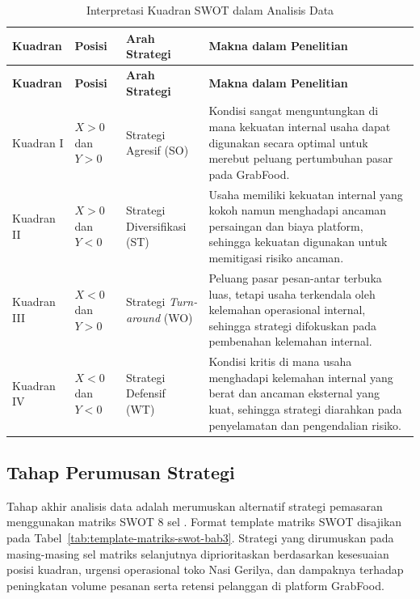 \begingroup
    \footnotesize
    \begin{xltabular}{\textwidth}{|Z{2.2cm}|Z{2.25cm}|L{3.4cm}|Y|}
        \caption{Interpretasi Kuadran SWOT dalam Analisis Data}
        \label{tab:interpretasi-kuadran-swot}\\
        \toprule
        \textbf{Kuadran} & \textbf{Posisi} & \textbf{Arah Strategi} & \textbf{Makna dalam Penelitian} \\ \hline
        \midrule
        \endfirsthead
        \toprule
        \textbf{Kuadran} & \textbf{Posisi} & \textbf{Arah Strategi} & \textbf{Makna dalam Penelitian} \\ \hline
        \midrule
        \endhead
        \endfoot
        \bottomrule
        \endlastfoot
        Kuadran I & $X > 0$ dan $Y > 0$ & Strategi Agresif (SO) & Kondisi sangat menguntungkan di mana kekuatan internal usaha dapat digunakan secara optimal untuk merebut peluang pertumbuhan pasar pada GrabFood. \\ \hline
        Kuadran II & $X > 0$ dan $Y < 0$ & Strategi Diversifikasi (ST) & Usaha memiliki kekuatan internal yang kokoh namun menghadapi ancaman persaingan dan biaya platform, sehingga kekuatan digunakan untuk memitigasi risiko ancaman. \\ \hline
        Kuadran III & $X < 0$ dan $Y > 0$ & Strategi \textit{Turn-around} (WO) & Peluang pasar pesan-antar terbuka luas, tetapi usaha terkendala oleh kelemahan operasional internal, sehingga strategi difokuskan pada pembenahan kelemahan internal. \\ \hline
        Kuadran IV & $X < 0$ dan $Y < 0$ & Strategi Defensif (WT) & Kondisi kritis di mana usaha menghadapi kelemahan internal yang berat dan ancaman eksternal yang kuat, sehingga strategi diarahkan pada penyelamatan dan pengendalian risiko. \\ \hline
    \end{xltabular}
\endgroup

\subsection{Tahap Perumusan Strategi}
Tahap akhir analisis data adalah merumuskan alternatif strategi pemasaran menggunakan matriks SWOT 8 sel \parencite{david2023strategicmanagement,rangkuti2016analisisSWOT}. Format template matriks SWOT disajikan pada Tabel~\ref{tab:template-matriks-swot-bab3}. Strategi yang dirumuskan pada masing-masing sel matriks selanjutnya diprioritaskan berdasarkan kesesuaian posisi kuadran, urgensi operasional toko Nasi Gerilya, dan dampaknya terhadap peningkatan volume pesanan serta retensi pelanggan di platform GrabFood.

